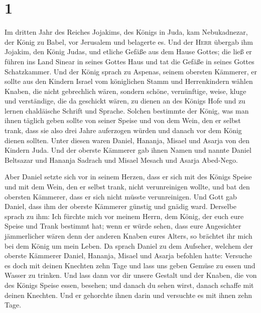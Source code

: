 \hypertarget{section}{%
\section{1}\label{section}}

 Im dritten Jahr des Reiches Jojakims, des Königs in Juda,
kam Nebukadnezar, der König zu Babel, vor Jerusalem und belagerte es.
 Und der \textsc{Herr} übergab ihm Jojakim, den König
Judas, und etliche Gefäße aus dem Hause Gottes; die ließ er führen ins
Land Sinear in seines Gottes Haus und tat die Gefäße in seines Gottes
Schatzkammer.  Und der König sprach zu Aspenas, seinem
obersten Kämmerer, er sollte aus den Kindern Israel vom königlichen
Stamm und Herrenkindern wählen  Knaben, die nicht
gebrechlich wären, sondern schöne, vernünftige, weise, kluge und
verständige, die da geschickt wären, zu dienen an des Königs Hofe und zu
lernen chaldäische Schrift und Sprache.  Solchen bestimmte
der König, was man ihnen täglich geben sollte von seiner Speise und von
dem Wein, den er selbst trank, dass sie also drei Jahre auferzogen
würden und danach vor dem König dienen sollten.  Unter
diesen waren Daniel, Hananja, Misael und Asarja von den Kindern Juda.
 Und der oberste Kämmerer gab ihnen Namen und nannte
Daniel Beltsazar und Hananja Sadrach und Misael Mesach und Asarja
Abed-Nego.

 Aber Daniel setzte sich vor in seinem Herzen, dass er
sich mit des Königs Speise und mit dem Wein, den er selbst trank, nicht
verunreinigen wollte, und bat den obersten Kämmerer, dass er sich nicht
müsste verunreinigen.  Und Gott gab Daniel, dass ihm der
oberste Kämmerer günstig und gnädig ward.  Derselbe
sprach zu ihm: Ich fürchte mich vor meinem Herrn, dem König, der euch
eure Speise und Trank bestimmt hat; wenn er würde sehen, dass eure
Angesichter jämmerlicher wären denn der anderen Knaben eures Alters, so
brächtet ihr mich bei dem König um mein Leben.  Da sprach
Daniel zu dem Aufseher, welchem der oberste Kämmerer Daniel, Hananja,
Misael und Asarja befohlen hatte:  Versuche es doch mit
deinen Knechten zehn Tage und lass uns geben Gemüse zu essen und Wasser
zu trinken.  Und lass dann vor dir unsere Gestalt und der
Knaben, die von des Königs Speise essen, besehen; und danach du sehen
wirst, danach schaffe mit deinen Knechten.  Und er
gehorchte ihnen darin und versuchte es mit ihnen zehn Tage.

